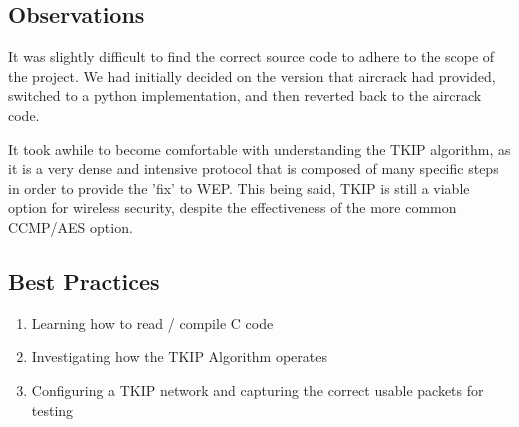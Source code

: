 \documentclass[main.tex]{subfiles}
\begin{document}
\subsection{Observations}

It was slightly difficult to find the correct source code to adhere to the scope of the project. We had initially decided on the version that aircrack had provided, switched to a python implementation, and then reverted back to the aircrack code. 

It took awhile to become comfortable with understanding the TKIP algorithm, as it is a very dense and intensive protocol that is composed of many specific steps in order to provide the 'fix' to WEP. This being said, TKIP is still a viable option for wireless security, despite the effectiveness of the more common CCMP/AES option.

\subsection{Best Practices}

\begin{enumerate}
    \item Learning how to read / compile C code
    \item Investigating how the TKIP Algorithm operates 
    \item Configuring a TKIP network and capturing the correct usable packets for testing
\end{enumerate}
\end{document}
